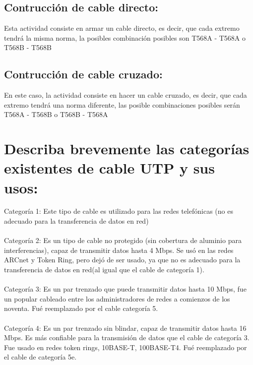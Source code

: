 \documentclass{article}
\begin{document}
\subsection{Contrucción de cable directo:}
Esta actividad consiste en armar un cable directo, es decir, que cada extremo tendrá la misma norma, la posibles combinación posibles son T568A - T568A o T568B - T568B\\

\subsection{Contrucción de cable cruzado:}
En este caso, la actividad consiste en hacer un cable cruzado, es decir, que cada extremo tendrá una norma diferente, las posible combinaciones posibles serán T568A - T568B o T568B - T568A\\

\section{Describa brevemente las categorías existentes de cable UTP y sus usos:}

Categoría 1: Este tipo de cable es utilizado para las redes telefónicas (no es adecuado para la transferencia de datos en red)\\\\

Categoría 2: Es un tipo de cable no protegido (sin cobertura de aluminio para interferencias), capaz de transmitir datos hasta 4 Mbps. Se usó en las redes ARCnet y Token Ring, pero dejó de ser usado, ya que no es adecuado para la transferencia de datos en red(al igual que el cable de categoría 1).\\\\

Categoría 3: Es un par trenzado que puede transmitir datos hasta 10 Mbps, fue un popular cableado entre los administradores de redes a comienzos de los noventa. Fué reemplazado por el cable categoría 5.\\\\

Categoría 4: Es un par trenzado sin blindar, capaz de transmitir datos hasta 16 Mbps. Es más confiable para la transmisión de datos que el cable de categoría 3. Fue usado en redes token rings, 10BASE-T, 100BASE-T4. Fué reemplazado por el cable de categoría 5e.\\\\
\end{document}
